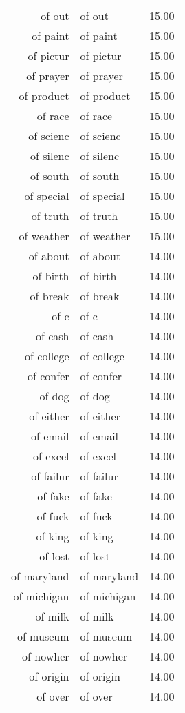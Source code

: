 \begin{table}[ht]
\begin{tabular}{rlr}
  of out & of out & 15.00 \\ 
  of paint & of paint & 15.00 \\ 
  of pictur & of pictur & 15.00 \\ 
  of prayer & of prayer & 15.00 \\ 
  of product & of product & 15.00 \\ 
  of race & of race & 15.00 \\ 
  of scienc & of scienc & 15.00 \\ 
  of silenc & of silenc & 15.00 \\ 
  of south & of south & 15.00 \\ 
  of special & of special & 15.00 \\ 
  of truth & of truth & 15.00 \\ 
  of weather & of weather & 15.00 \\ 
  of about & of about & 14.00 \\ 
  of birth & of birth & 14.00 \\ 
  of break & of break & 14.00 \\ 
  of c & of c & 14.00 \\ 
  of cash & of cash & 14.00 \\ 
  of college & of college & 14.00 \\ 
  of confer & of confer & 14.00 \\ 
  of dog & of dog & 14.00 \\ 
  of either & of either & 14.00 \\ 
  of email & of email & 14.00 \\ 
  of excel & of excel & 14.00 \\ 
  of failur & of failur & 14.00 \\ 
  of fake & of fake & 14.00 \\ 
  of fuck & of fuck & 14.00 \\ 
  of king & of king & 14.00 \\ 
  of lost & of lost & 14.00 \\ 
  of maryland & of maryland & 14.00 \\ 
  of michigan & of michigan & 14.00 \\ 
  of milk & of milk & 14.00 \\ 
  of museum & of museum & 14.00 \\ 
  of nowher & of nowher & 14.00 \\ 
  of origin & of origin & 14.00 \\ 
  of over & of over & 14.00 \\ 

\end{tabular}
\end{table}
